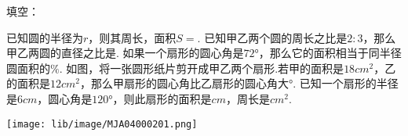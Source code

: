 填空：

\begin{subquestions}
    \subquestion 已知圆的半径为$r$，则其周长\key{}，面积$S=$\key{}.
    \subquestion 已知甲乙两个圆的周长之比是$2:3$，那么甲乙两圆的直径之比是.
    \subquestion 如果一个扇形的圆心角是$72°$，那么它的面积相当于同半径圆面积的\key{}$\%$.
    \subquestion 如图，将一张圆形纸片剪开成甲乙两个扇形.若甲的面积是$18cm^2$，乙的面积是$12cm^2$，那么甲扇形的圆心角比乙扇形的圆心角大\key{}°.
    \subquestion 已知一个扇形的半径是$6cm$，圆心角是$120°$，则此扇形的面积是\key{}$cm$，周长是\key{}$cm^2$.
    

\end{subquestions}
\begin{center}
    \texttt{[image: lib/image/MJA04000201.png]}
\end{center}